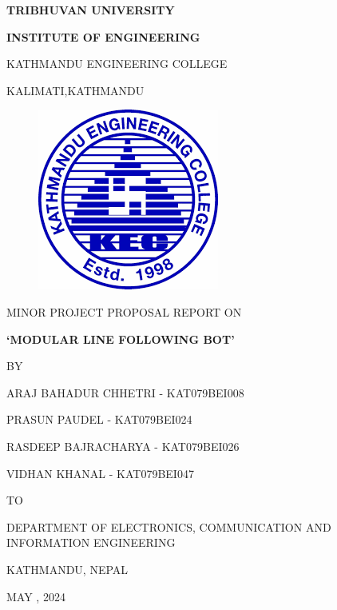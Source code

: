\begin{titlepage}
    \thispagestyle{empty}
    \begin{center}
    
    \vspace*{\fill} %
    \vspace*{-1cm}
    {\large \textbf{TRIBHUVAN UNIVERSITY
}\par}
{\large \textbf{INSTITUTE OF ENGINEERING
}\par}
\vspace{8pt}
KATHMANDU ENGINEERING COLLEGE

KALIMATI,KATHMANDU
\vspace{24pt}

\begin{figure}[ht]
    \centering
    \includegraphics[scale=0.45]{images/kec.png}
\end{figure}
\vspace{24pt}
{MINOR PROJECT PROPOSAL REPORT ON\par}
\vspace{14pt}
{\textbf{ `MODULAR LINE FOLLOWING BOT'}\par}

\vspace{14pt}
{BY\par}
\vspace{14pt}

{ ARAJ BAHADUR CHHETRI - KAT079BEI008\par}
{ PRASUN PAUDEL - KAT079BEI024\par}
{RASDEEP BAJRACHARYA - KAT079BEI026\par}
{VIDHAN KHANAL - KAT079BEI047\par}

\vspace{24pt}
{TO\par}
\vspace{14pt}
{DEPARTMENT OF ELECTRONICS, COMMUNICATION AND INFORMATION ENGINEERING\par}
{KATHMANDU, NEPAL\par}
{MAY , 2024\par}


    \end{center}
\end{titlepage}